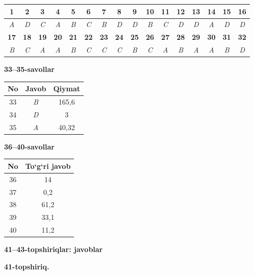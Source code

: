 \documentclass[11pt,a4paper]{article}
\begin{document}
\noindent\begin{tabular}{|c|c|c|c|c|c|c|c|c|c|c|c|c|c|c|c|}\hline
\textbf{1} & \textbf{2} & \textbf{3} & \textbf{4} & \textbf{5} & \textbf{6} & \textbf{7} & \textbf{8} & \textbf{9} & \textbf{10} & \textbf{11} & \textbf{12} & \textbf{13} & \textbf{14} & \textbf{15} & \textbf{16}\\\hline
\textsl{A} & \textsl{D} & \textsl{C} & \textsl{A} & \textsl{B} & \textsl{C} & \textsl{B} & \textsl{D} & \textsl{D} & \textsl{B} & \textsl{C} & \textsl{D} & \textsl{D} & \textsl{A} & \textsl{D} & \textsl{D}\\\hline
\textbf{17} & \textbf{18} & \textbf{19} & \textbf{20} & \textbf{21} & \textbf{22} & \textbf{23} & \textbf{24} & \textbf{25} & \textbf{26} & \textbf{27} & \textbf{28} & \textbf{29} & \textbf{30} & \textbf{31} & \textbf{32}\\\hline
\textsl{B} & \textsl{C} & \textsl{A} & \textsl{A} & \textsl{B} & \textsl{C} & \textsl{C} & \textsl{C} & \textsl{B} & \textsl{C} & \textsl{A} & \textsl{B} & \textsl{A} & \textsl{A} & \textsl{B} & \textsl{D}\\\hline
\end{tabular}\par\medskip
\noindent\textbf{33--35-savollar}\par\smallskip
\noindent\begin{tabular}{|c|c|c|}\hline \textbf{No} & \textbf{Javob} & \textbf{Qiymat}\\\hline
33 & \textsl{B} & 165,6\\\hline
34 & \textsl{D} & 3\\\hline
35 & \textsl{A} & 40,32\\\hline
\end{tabular}\par\medskip
\noindent\textbf{36--40-savollar}\par\smallskip
\noindent\begin{tabular}{|c|c|}\hline \textbf{No} & \textbf{To`g`ri javob}\\\hline
36 & 14\\\hline
37 & 0,2\\\hline
38 & 61,2\\\hline
39 & 33,1\\\hline
40 & 11,2\\\hline
\end{tabular}\par\medskip
\noindent\textbf{41--43-topshiriqlar: javoblar}\par\smallskip
\noindent\textbf{41-topshiriq.}\par
\end{document}
